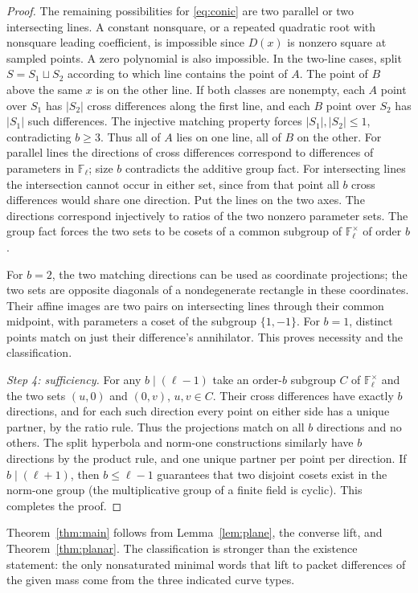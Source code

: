 \documentclass[11pt]{article}
\theoremstyle{remark}\newtheorem{remark}[theorem]{Remark}
\newcommand{\F}{\mathbb F}
\begin{document}
\begin{proof}
The remaining possibilities for \eqref{eq:conic} are two parallel or two intersecting lines. A constant nonsquare, or a repeated quadratic root with nonsquare leading coefficient, is impossible since $D(x)$ is nonzero square at sampled points. A zero polynomial is also impossible. In the two-line cases, split $S=S_1\sqcup S_2$ according to which line contains the point of $A$. The point of $B$ above the same $x$ is on the other line. If both classes are nonempty, each $A$ point over $S_1$ has $|S_2|$ cross differences along the first line, and each $B$ point over $S_2$ has $|S_1|$ such differences. The injective matching property forces $|S_1|,|S_2|\le1$, contradicting $b\ge3$. Thus all of $A$ lies on one line, all of $B$ on the other. For parallel lines the directions of cross differences correspond to differences of parameters in $\F_\ell$; size $b$ contradicts the additive group fact. For intersecting lines the intersection cannot occur in either set, since from that point all $b$ cross differences would share one direction. Put the lines on the two axes. The directions correspond injectively to ratios of the two nonzero parameter sets. The group fact forces the two sets to be cosets of a common subgroup of $\F_\ell^\times$ of order $b$.

For $b=2$, the two matching directions can be used as coordinate projections; the two sets are opposite diagonals of a nondegenerate rectangle in these coordinates. Their affine images are two pairs on intersecting lines through their common midpoint, with parameters a coset of the subgroup $\{1,-1\}$. For $b=1$, distinct points match on just their difference's annihilator. This proves necessity and the classification.

\emph{Step 4: sufficiency.} For any $b\mid(\ell-1)$ take an order-$b$ subgroup $C$ of $\F_\ell^\times$ and the two sets $(u,0)$ and $(0,v)$, $u,v\in C$. Their cross differences have exactly $b$ directions, and for each such direction every point on either side has a unique partner, by the ratio rule. Thus the projections match on all $b$ directions and no others. The split hyperbola and norm-one constructions similarly have $b$ directions by the product rule, and one unique partner per point per direction. If $b\mid(\ell+1)$, then $b\le\ell-1$ guarantees that two disjoint cosets exist in the norm-one group (the multiplicative group of a finite field is cyclic). This completes the proof.
\end{proof}
Theorem~\ref{thm:main} follows from Lemma~\ref{lem:plane}, the converse lift, and Theorem~\ref{thm:planar}. The classification is stronger than the existence statement: the only nonsaturated minimal words that lift to packet differences of the given mass come from the three indicated curve types.
\end{document}
